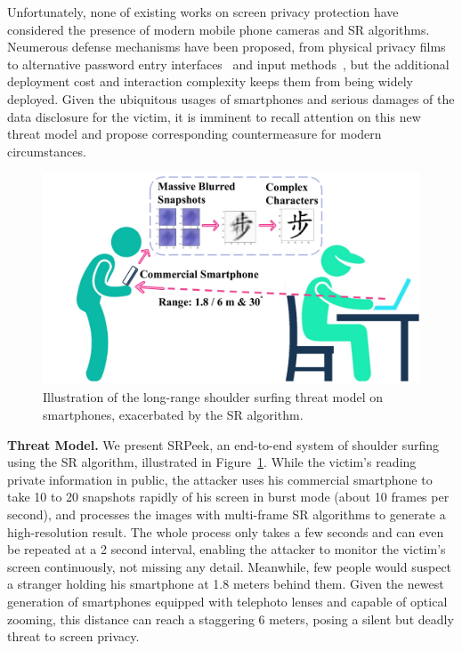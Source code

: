 Unfortunately, none of existing works on screen privacy protection have considered the presence of modern mobile phone cameras and SR algorithms. Neumerous defense mechanisms have been proposed, from physical privacy films to alternative password entry interfaces~\cite{wiedenbeck2006design,papadopoulos2017illusionpin} and input methods~\cite{kumar2007reducing}, but the additional deployment cost and interaction complexity keeps them from being widely deployed\cite{Chun2019Keep}. Given the ubiquitous usages of smartphones and serious damages of the data disclosure for the victim, it is imminent to recall attention on this new threat model and propose corresponding countermeasure for modern circumstances.

\begin{figure}
	\centering
	\includegraphics[width=0.80\linewidth]{pic/illustration.pdf}
    \caption{Illustration of the long-range shoulder surfing threat model on smartphones, exacerbated by the SR algorithm.}
	\label{overview}
\end{figure}

\vspace{1mm}
\noindent
\textbf{Threat Model.} We present \textsf{SRPeek}, an end-to-end system of shoulder surfing using the SR algorithm, illustrated in Figure~\ref{overview}. 
While the victim's reading private information in public, the attacker uses his commercial smartphone to take 10 to 20 snapshots rapidly of his screen in burst mode (about 10 frames per second), and processes the images with multi-frame SR algorithms to generate a high-resolution result. The whole process only takes a few seconds and can even be repeated at a 2 second interval, enabling the attacker to monitor the victim's screen continuously, not missing any detail. Meanwhile, few people would suspect a stranger holding his smartphone at 1.8 meters behind them. Given the newest generation of smartphones equipped with telephoto lenses and capable of optical zooming, this distance can reach a staggering 6 meters, posing a silent but deadly threat to screen privacy.

